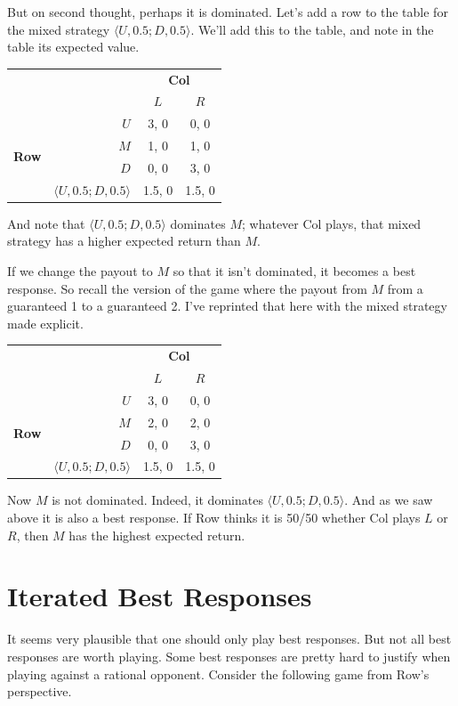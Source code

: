 \documentclass[openany]{book}
\begin{document}
But on second thought, perhaps it is dominated. Let's add a row to the table for the mixed strategy $\langle U, 0.5; D, 0.5 \rangle$. We'll add this to the table, and note in the table its expected value.

\begin{center}
\begin{tabular}{l r | c c}
& & \multicolumn{2}{c}{\textbf{Col}} \\
& & $L$ & $R$ \\ \hline
\multirow{4}{*}{\textbf{Row}} & $U$ & 3, 0 & 0, 0 \\
& $M$ & 1, 0 & 1, 0 \\
& $D$ & 0, 0 & 3, 0 \\
& $\langle U, 0.5; D, 0.5 \rangle$ & 1.5, 0 & 1.5, 0
\end{tabular}
\end{center}
And note that $\langle U, 0.5; D, 0.5 \rangle$ dominates $M$; whatever Col plays, that mixed strategy has a higher expected return than $M$.

If we change the payout to $M$ so that it isn't dominated, it becomes a best response. So recall the version of the game where the payout from $M$ from a guaranteed 1 to a guaranteed 2. I've reprinted that here with the mixed strategy made explicit.

\begin{center}
\begin{tabular}{l r | c c}
& & \multicolumn{2}{c}{\textbf{Col}} \\
& & $L$ & $R$ \\ \hline
\multirow{4}{*}{\textbf{Row}} & $U$ & 3, 0 & 0, 0 \\
& $M$ & 2, 0 & 2, 0 \\
& $D$ & 0, 0 & 3, 0 \\
& $\langle U, 0.5; D, 0.5 \rangle$ & 1.5, 0 & 1.5, 0
\end{tabular}
\end{center}
Now $M$ is not dominated. Indeed, it dominates $\langle U, 0.5; D, 0.5 \rangle$. And as we saw above it is also a best response. If Row thinks it is 50/50 whether Col plays $L$ or $R$, then $M$ has the highest expected return.

\section{Iterated Best Responses}

It seems very plausible that one should only play best responses. But not all best responses are worth playing. Some best responses are pretty hard to justify when playing against a rational opponent. Consider the following game from Row's perspective.
\end{document}
